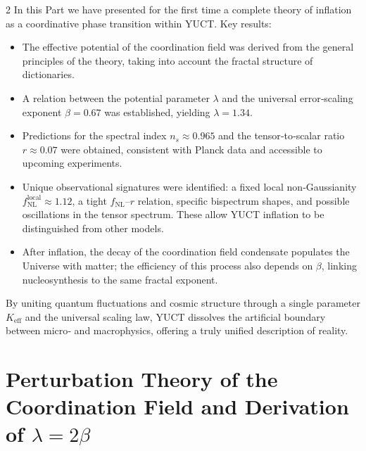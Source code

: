 \documentclass[12pt,a4paper]{article}
\begin{document}
\begin{multicols}{2}
		In this Part we have presented for the first time a complete theory of inflation as a coordinative phase transition within YUCT. Key results:
		
		\begin{itemize}
			\item The effective potential of the coordination field was derived from the general principles of the theory, taking into account the fractal structure of dictionaries.
			\item A relation between the potential parameter \(\lambda\) and the universal error‑scaling exponent \(\beta = 0.67\) was established, yielding \(\lambda = 1.34\).
			\item Predictions for the spectral index \(n_s \approx 0.965\) and the tensor‑to‑scalar ratio \(r \approx 0.07\) were obtained, consistent with Planck data and accessible to upcoming experiments.
			\item Unique observational signatures were identified: a fixed local non‑Gaussianity \(f_{\text{NL}}^{\text{local}} \approx 1.12\), a tight \(f_{\text{NL}}\)–\(r\) relation, specific bispectrum shapes, and possible oscillations in the tensor spectrum. These allow YUCT inflation to be distinguished from other models.
			\item After inflation, the decay of the coordination field condensate populates the Universe with matter; the efficiency of this process also depends on \(\beta\), linking nucleosynthesis to the same fractal exponent.
		\end{itemize}
		
		By uniting quantum fluctuations and cosmic structure through a single parameter \(K_{\mathrm{eff}}\) and the universal scaling law, YUCT dissolves the artificial boundary between micro‑ and macrophysics, offering a truly unified description of reality.
		
	\end{multicols}
	
	\appendix
	\section{Perturbation Theory of the Coordination Field and Derivation of \(\lambda = 2\beta\)}
	\label{app:perturbations}
	
\end{document}
